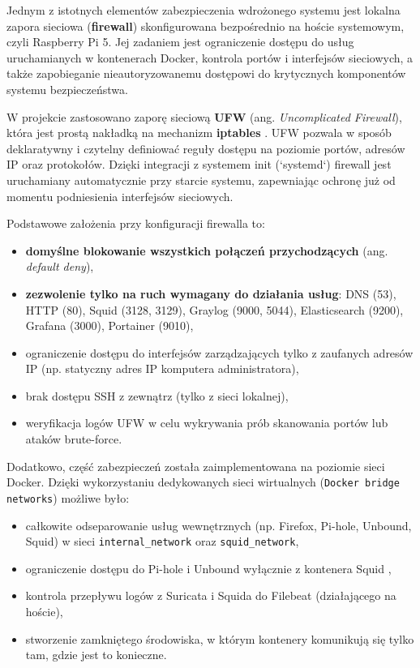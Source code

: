 \documentclass[
    left=2.5cm,         %
    right=2.5cm,        %
    top=2.5cm,          %
    bottom=3cm,         %
    bindingoffset=6mm,  %
    nohyphenation=true %
]{eiti/eiti-thesis} %
\begin{document}
Jednym z istotnych elementów zabezpieczenia wdrożonego systemu jest lokalna zapora sieciowa (\textbf{firewall}) skonfigurowana bezpośrednio na hoście systemowym, czyli Raspberry Pi 5. Jej zadaniem jest ograniczenie dostępu do usług uruchamianych w kontenerach Docker, kontrola portów i interfejsów sieciowych, a także zapobieganie nieautoryzowanemu dostępowi do krytycznych komponentów systemu bezpieczeństwa.

W projekcie zastosowano zaporę sieciową \textbf{UFW} (ang. \textit{Uncomplicated Firewall}), która jest prostą nakładką na mechanizm \textbf{iptables} \cite{ufw-docs}. UFW pozwala w sposób deklaratywny i czytelny definiować reguły dostępu na poziomie portów, adresów IP oraz protokołów. Dzięki integracji z systemem init (`systemd`) firewall jest uruchamiany automatycznie przy starcie systemu, zapewniając ochronę już od momentu podniesienia interfejsów sieciowych.

Podstawowe założenia przy konfiguracji firewalla to:
\begin{itemize}
    \item \textbf{domyślne blokowanie wszystkich połączeń przychodzących} (ang. \textit{default deny}),
    \item \textbf{zezwolenie tylko na ruch wymagany do działania usług}: DNS (53), HTTP (80), Squid (3128, 3129), Graylog (9000, 5044), Elasticsearch (9200), Grafana (3000), Portainer (9010),
    \item ograniczenie dostępu do interfejsów zarządzających tylko z zaufanych adresów IP (np. statyczny adres IP komputera administratora),
    \item brak dostępu SSH z zewnątrz (tylko z sieci lokalnej),
    \item weryfikacja logów UFW w celu wykrywania prób skanowania portów lub ataków brute-force.
\end{itemize}

Dodatkowo, część zabezpieczeń została zaimplementowana na poziomie sieci Docker. Dzięki wykorzystaniu dedykowanych sieci wirtualnych (\texttt{Docker bridge networks}) możliwe było:
\begin{itemize}
    \item całkowite odseparowanie usług wewnętrznych (np. Firefox, Pi-hole, Unbound, Squid) w sieci \texttt{internal\_network} oraz \texttt{squid\_network},
    \item ograniczenie dostępu do Pi-hole i Unbound wyłącznie z kontenera Squid ,
    \item kontrola przepływu logów z Suricata i Squida do Filebeat (działającego na hoście),
    \item stworzenie zamkniętego środowiska, w którym kontenery komunikują się tylko tam, gdzie jest to konieczne.
\end{itemize}
\end{document}
